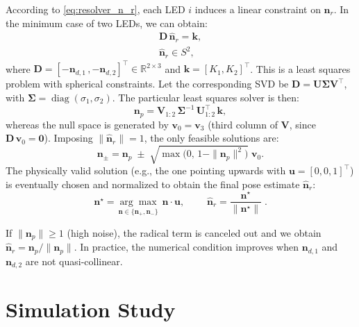 \documentclass[conference]{IEEEtran}
\begin{document}
According to \eqref{eq:resolver_n_r}, each LED \(i\) induces a linear constraint on \(\mathbf n_r\). In the minimum case of two LEDs, we can obtain:
\begin{equation}
    \begin{aligned}
    \mathbf{D} \, \hat{\mathbf{n}}_r = \mathbf{k}, \\
    \hat{\mathbf{n}}_r \in S^2,
    \end{aligned}    
    \label{eq:orientacion}
\end{equation}
where $\mathbf{D}=[-\mathbf{n}_{d,1}\,, -\mathbf{n}_{d,2}]^\top \in\mathbb R^{2\times 3}$ and $\mathbf{k}=[K_1,K_2]^\top$.
This is a least squares problem with spherical constraints. Let the corresponding SVD be \(\mathbf D=\mathbf U\boldsymbol\Sigma\mathbf V^\top\), with \(\boldsymbol\Sigma=\operatorname{diag}(\sigma_1,\sigma_2)\).
The particular least squares solver is then:
\begin{equation}
\mathbf n_p=\mathbf V_{1:2}\,\boldsymbol\Sigma^{-1}\,\mathbf U_{1:2}^{\top}\,\mathbf k,
\end{equation}
whereas the null space is generated by \(\mathbf v_0=\mathbf v_3\) (third column of \(\mathbf V\), since \(\mathbf D\,\mathbf v_0=\mathbf 0\)).
Imposing \(\|\hat{\mathbf n}_r\|=1\), the only feasible solutions are:
\begin{equation}
\mathbf n_{\pm}=\mathbf n_p \;\pm\; \sqrt{\max\!\bigl(0,\,1-\|\mathbf n_p\|^2\bigr)}\;\mathbf v_0.
\end{equation}
The physically valid solution (e.g., the one pointing upwards with \(\mathbf u=[0,0,1]^\top\)) is eventually chosen and normalized to obtain the final pose estimate $\hat{\mathbf n}_r$:
\begin{equation}
\mathbf n^\star=\underset{\mathbf n\in\{\mathbf n_+,\mathbf n_-\}}{\arg\max}\;\mathbf n\cdot\mathbf u,
\qquad
\;\hat{\mathbf n}_r=\dfrac{\mathbf n^\star}{\|\mathbf n^\star\|}\;.    
\end{equation}

If \(\|\mathbf n_p\|\ge 1\) (high noise), the radical term is canceled out and we obtain \(\hat{\mathbf n}_r=\mathbf n_p/\|\mathbf n_p\|\).
In practice, the numerical condition improves when \(\mathbf n_{d,1}\) and \(\mathbf n_{d,2}\) are not quasi-collinear.


\section{Simulation Study}
\label{sec:simulation}
\end{document}
